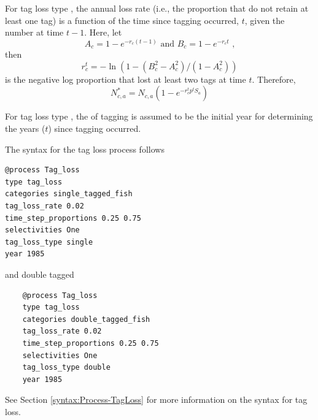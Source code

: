 For tag loss type , the annual loss rate (i.e., the proportion that do not retain at least one tag) is a function of the time since tagging occurred, $t$, given the number at time $t-1$. Here, let
\begin{equation}
	A_c = 1-e^{-r_c (t-1)} \text{\ and\ }
	B_c = 1-e^{-r_c t} \text{\ ,} 
\end{equation}
then 
\begin{equation}
	r^t_c = -\ln(1 - (B^2_c - A^2_c) / (1-A^2_c))
\end{equation}
is the negative log proportion that lost at least two tags at time $t$. Therefore, 
\begin{equation}
	N^*_{c,a} = N_{c,a} (1-e^{-r^t_c p^t S_a})
\end{equation}

For tag loss type , the  of tagging is assumed to be the initial year for determining the years ($t$) since tagging occurred.

The syntax for the tag loss process follows

{\small{\begin{verbatim}
@process Tag_loss
type tag_loss
categories single_tagged_fish
tag_loss_rate 0.02
time_step_proportions 0.25 0.75
selectivities One
tag_loss_type single
year 1985
\end{verbatim}}}

and double tagged

{\small{\begin{verbatim}
	@process Tag_loss
	type tag_loss
	categories double_tagged_fish
	tag_loss_rate 0.02
	time_step_proportions 0.25 0.75
	selectivities One
	tag_loss_type double
	year 1985
\end{verbatim}}}

See Section \ref{syntax:Process-TagLoss} for more information on the syntax for tag loss.